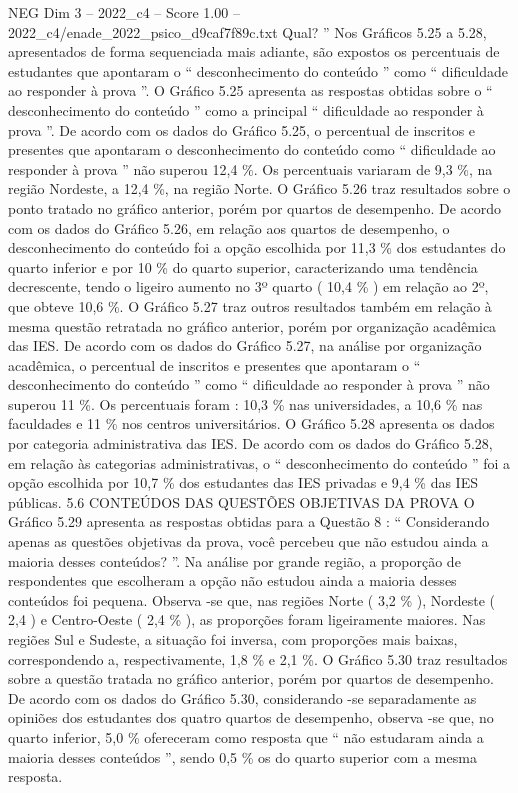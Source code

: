 \begin{textsample}{NEG Dim 3 – 2022\_c4 – Score 1.00 – 2022\_c4/enade\_2022\_psico\_d9caf7f89c.txt}
Qual? ” Nos Gráficos 5.25 a 5.28, apresentados de forma sequenciada mais adiante, são expostos os percentuais de estudantes que apontaram o “ desconhecimento do conteúdo ” como “ dificuldade ao responder à prova ”.
O Gráfico 5.25 apresenta as respostas obtidas sobre o “ desconhecimento do conteúdo ” como a principal “ dificuldade ao responder à prova ”.
De acordo com os dados do Gráfico 5.25, o percentual de inscritos e presentes que apontaram o desconhecimento do conteúdo como “ dificuldade ao responder à prova ” não superou 12,4 \%.
Os percentuais variaram de 9,3 \%, na região Nordeste, a 12,4 \%, na região Norte.
O Gráfico 5.26 traz resultados sobre o ponto tratado no gráfico anterior, porém por quartos de desempenho.
De acordo com os dados do Gráfico 5.26, em relação aos quartos de desempenho, o desconhecimento do conteúdo foi a opção escolhida por 11,3 \% dos estudantes do quarto inferior e por 10 \% do quarto superior, caracterizando uma tendência decrescente, tendo o ligeiro aumento no 3º quarto ( 10,4 \% ) em relação ao 2º, que obteve 10,6 \%.
O Gráfico 5.27 traz outros resultados também em relação à mesma questão retratada no gráfico anterior, porém por organização acadêmica das IES.
De acordo com os dados do Gráfico 5.27, na análise por organização acadêmica, o percentual de inscritos e presentes que apontaram o “ desconhecimento do conteúdo ” como “ dificuldade ao responder à prova ” não superou 11 \%.
Os percentuais foram : 10,3 \% nas universidades, a 10,6 \% nas faculdades e 11 \% nos centros universitários.
O Gráfico 5.28 apresenta os dados por categoria administrativa das IES.
De acordo com os dados do Gráfico 5.28, em relação às categorias administrativas, o “ desconhecimento do conteúdo ” foi a opção escolhida por 10,7 \% dos estudantes das IES privadas e 9,4 \% das IES públicas. 5.6 CONTEÚDOS DAS QUESTÕES OBJETIVAS DA PROVA O Gráfico 5.29 apresenta as respostas obtidas para a Questão 8 : “ Considerando apenas as questões objetivas da prova, você percebeu que não estudou ainda a maioria desses conteúdos? ”.
Na análise por grande região, a proporção de respondentes que escolheram a opção não estudou ainda a maioria desses conteúdos foi pequena.
Observa -se que, nas regiões Norte ( 3,2 \% ), Nordeste ( 2,4 ) e Centro-Oeste ( 2,4 \% ), as proporções foram ligeiramente maiores.
Nas regiões Sul e Sudeste, a situação foi inversa, com proporções mais baixas, correspondendo a, respectivamente, 1,8 \% e 2,1 \%.
O Gráfico 5.30 traz resultados sobre a questão tratada no gráfico anterior, porém por quartos de desempenho.
De acordo com os dados do Gráfico 5.30, considerando -se separadamente as opiniões dos estudantes dos quatro quartos de desempenho, observa -se que, no quarto inferior, 5,0 \% ofereceram como resposta que “ não estudaram ainda a maioria desses conteúdos ”, sendo 0,5 \% os do quarto superior com a mesma resposta.

\end{textsample}
